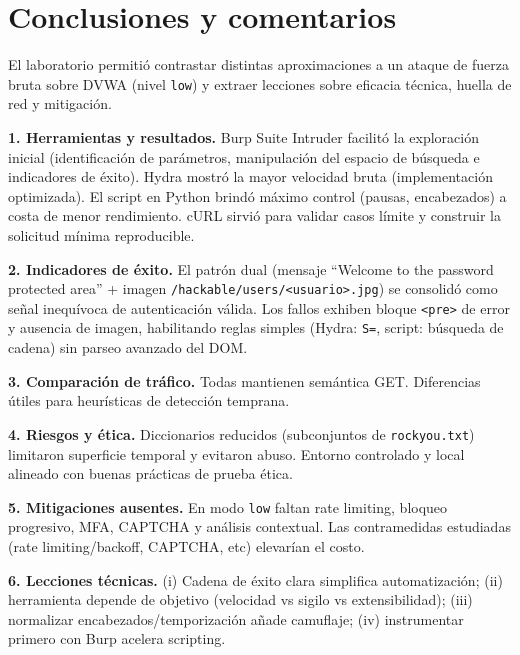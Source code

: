 \documentclass[letterpaper,12pt]{article}
\begin{document}

\section*{Conclusiones y comentarios}
El laboratorio permitió contrastar distintas aproximaciones a un ataque de fuerza bruta sobre DVWA (nivel \texttt{low}) y extraer lecciones sobre eficacia técnica, huella de red y mitigación.

    	\textbf{1. Herramientas y resultados.} Burp Suite Intruder facilitó la exploración inicial (identificación de parámetros, manipulación del espacio de búsqueda e indicadores de éxito). Hydra mostró la mayor velocidad bruta (implementación optimizada). El script en Python brindó máximo control (pausas, encabezados) a costa de menor rendimiento. cURL sirvió para validar casos límite y construir la solicitud mínima reproducible.

    	\textbf{2. Indicadores de éxito.} El patrón dual (mensaje “Welcome to the password protected area” + imagen \texttt{/hackable/users/<usuario>.jpg}) se consolidó como señal inequívoca de autenticación válida. Los fallos exhiben bloque \texttt{<pre>} de error y ausencia de imagen, habilitando reglas simples (Hydra: \texttt{S=}, script: búsqueda de cadena) sin parseo avanzado del DOM.

    	\textbf{3. Comparación de tráfico.} Todas mantienen semántica GET. Diferencias útiles para heurísticas de detección temprana.

    	\textbf{4. Riesgos y ética.} Diccionarios reducidos (subconjuntos de \texttt{rockyou.txt}) limitaron superficie temporal y evitaron abuso. Entorno controlado y local alineado con buenas prácticas de prueba ética.

    	\textbf{5. Mitigaciones ausentes.} En modo \texttt{low} faltan rate limiting, bloqueo progresivo, MFA, CAPTCHA y análisis contextual. Las contramedidas estudiadas (rate limiting/backoff, CAPTCHA, etc) elevarían el costo.

    	\textbf{6. Lecciones técnicas.} (i) Cadena de éxito clara simplifica automatización; (ii) herramienta depende de objetivo (velocidad vs sigilo vs extensibilidad); (iii) normalizar encabezados/temporización añade camuflaje; (iv) instrumentar primero con Burp acelera scripting.
\end{document}
